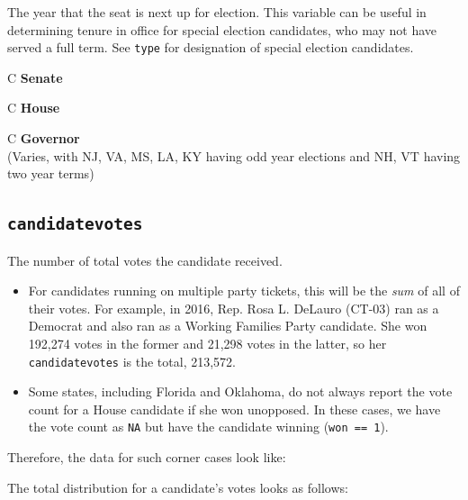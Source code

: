 \documentclass[12pt]{article}
\begin{document}
The year that the seat is next up for election. This variable can be useful in determining tenure in office for special election candidates, who may not have served a full term. See \texttt{type} for designation of special election candidates.

\begin{tabularx}{\linewidth}{C}
\textbf{Senate}\\

\end{tabularx}

\begin{tabularx}{\linewidth}{C}
\textbf{House}\\

\end{tabularx}

\begin{tabularx}{\linewidth}{C}
\textbf{Governor}\\
(Varies, with NJ, VA, MS, LA, KY having odd year elections and NH, VT having two year terms)
\end{tabularx}

\FloatBarrier

\subsection*{\texttt{candidatevotes}}

The number of total votes the candidate received.
\begin{itemize}
\item For candidates running on multiple party tickets, this will be the \emph{sum} of all of their votes.  For example, in 2016, Rep. Rosa L. DeLauro (CT-03) ran as a Democrat and also ran as a Working Families Party candidate. She won 192,274 votes in the former and 21,298 votes in the latter, so her \texttt{candidatevotes} is the total, 213,572.
\item  Some states, including Florida and Oklahoma, do not always report the vote count for a House candidate if she won unopposed. In these cases, we have the vote count as \texttt{NA} but have the candidate winning (\texttt{won == 1}).
\end{itemize}

Therefore, the data for such corner cases look like:

\begin{table}[!h]
\centering
\footnotesize

\end{table}


The total distribution for a candidate's votes looks as follows:
\end{document}
